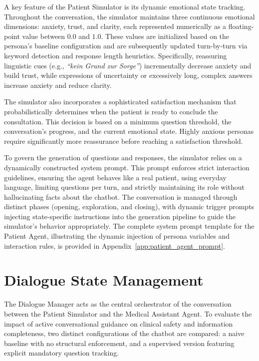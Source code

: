 A key feature of the Patient Simulator is its dynamic emotional state tracking. 
Throughout the conversation, the simulator maintains three continuous emotional dimensions: anxiety, trust, and clarity, each represented numerically as a floating-point value between $0.0$ and $1.0$. 
These values are initialized based on the persona's baseline configuration and are subsequently updated turn-by-turn via keyword detection and response length heuristics. 
Specifically, reassuring linguistic cues (e.g., \textit{``kein Grund zur Sorge''}) incrementally decrease anxiety and build trust, while expressions of uncertainty or excessively long, complex answers increase anxiety and reduce clarity.

The simulator also incorporates a sophisticated satisfaction mechanism that probabilistically determines when the patient is ready to conclude the consultation. 
This decision is based on a minimum question threshold, the conversation's progress, and the current emotional state. 
Highly anxious personas require significantly more reassurance before reaching a satisfaction threshold.

To govern the generation of questions and responses, the simulator relies on a dynamically constructed system prompt. 
This prompt enforces strict interaction guidelines, ensuring the agent behaves like a real patient, using everyday language, limiting questions per turn, and strictly maintaining its role without hallucinating facts about the chatbot. 
The conversation is managed through distinct phases (opening, exploration, and closing), with dynamic trigger prompts injecting state-specific instructions into the generation pipeline to guide the simulator's behavior appropriately.
The complete system prompt template for the Patient Agent, illustrating the dynamic injection of persona variables and interaction rules, is provided in Appendix~\ref{app:patient_agent_prompt}.

\section{Dialogue State Management}

The Dialogue Manager acts as the central orchestrator of the conversation between the Patient Simulator and the Medical Assistant Agent. 
To evaluate the impact of active conversational guidance on clinical safety and information completeness, two distinct configurations of the chatbot are compared: a naive baseline with no structural enforcement, and a supervised version featuring explicit mandatory question tracking.

